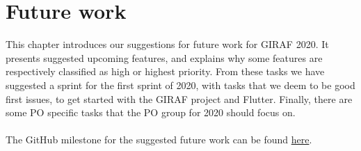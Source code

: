 \chapter{Future work}
This chapter introduces our suggestions for future work for GIRAF 2020. 
It presents suggested upcoming features, and explains why some features are respectively classified as high or highest priority.
From these tasks we have suggested a sprint for the first sprint of 2020, with tasks that we deem to be good first issues, to get started with the GIRAF project and Flutter.
Finally, there are some PO specific tasks that the PO group for 2020 should focus on.\\\\
The GitHub milestone for the suggested future work can be found \href{https://github.com/issues?utf8=%E2%9C%93&q=milestone%3A%222020S1%22+user%3Aaau-giraf+is%3Aopen+}{here}.



